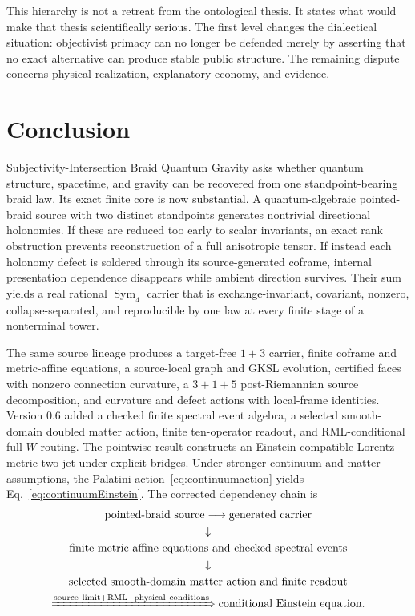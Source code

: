 \documentclass[11pt]{article}
\theoremstyle{definition}
\theoremstyle{remark}
\newcommand{\Sym}{\operatorname{Sym}}
\begin{document}
This hierarchy is not a retreat from the ontological thesis. It states what would make that thesis scientifically serious. The first level changes the dialectical situation: objectivist primacy can no longer be defended merely by asserting that no exact alternative can produce stable public structure. The remaining dispute concerns physical realization, explanatory economy, and evidence.

\section{Conclusion}

Subjectivity-Intersection Braid Quantum Gravity asks whether quantum structure, spacetime, and gravity can be recovered from one standpoint-bearing braid law. Its exact finite core is now substantial. A quantum-algebraic pointed-braid source with two distinct standpoints generates nontrivial directional holonomies. If these are reduced too early to scalar invariants, an exact rank obstruction prevents reconstruction of a full anisotropic tensor. If instead each holonomy defect is soldered through its source-generated coframe, internal presentation dependence disappears while ambient direction survives. Their sum yields a real rational $\Sym_4$ carrier that is exchange-invariant, covariant, nonzero, collapse-separated, and reproducible by one law at every finite stage of a nonterminal tower.

The same source lineage produces a target-free $1+3$ carrier, finite coframe and metric-affine equations, a source-local graph and GKSL evolution, certified faces with nonzero connection curvature, a $3+1+5$ post-Riemannian source decomposition, and curvature and defect actions with local-frame identities. Version 0.6 added a checked finite spectral event algebra, a selected smooth-domain doubled matter action, finite ten-operator readout, and RML-conditional full-$W$ routing. The pointwise result constructs an Einstein-compatible Lorentz metric two-jet under explicit bridges. Under stronger continuum and matter assumptions, the Palatini action~\eqref{eq:continuumaction} yields Eq.~\eqref{eq:continuumEinstein}. The corrected dependency chain is
\[
 \begin{gathered}
 \text{pointed-braid source}\longrightarrow\text{generated carrier}\\
 \downarrow\\
 \text{finite metric-affine equations and checked spectral events}\\
 \downarrow\\
 \text{selected smooth-domain matter action and finite readout}\\
 \xRightarrow{\mathrm{source\ limit+RML+physical\ conditions}}\text{conditional Einstein equation}.
 \end{gathered}
\]
\end{document}
